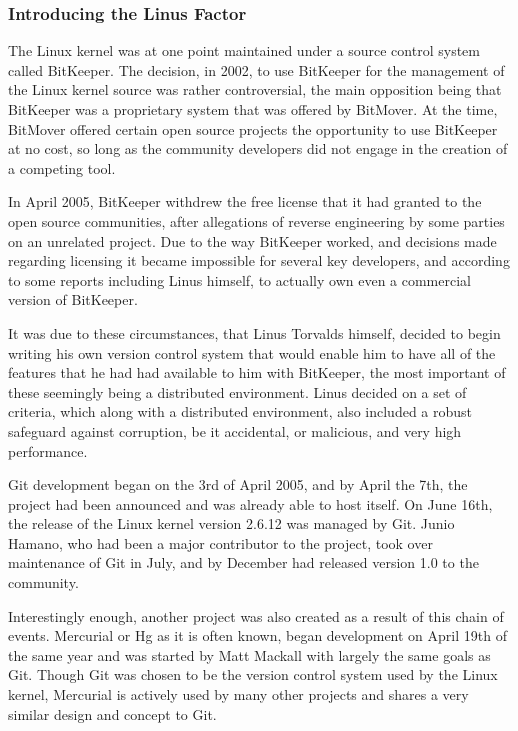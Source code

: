 \subsubsection{Introducing the Linus Factor}
The Linux kernel was at one point maintained under a source control system called BitKeeper.  The decision, in 2002, to use BitKeeper for the management of the Linux kernel source was rather controversial, the main opposition being that BitKeeper was a proprietary system that was offered by BitMover.  At the time, BitMover offered certain open source projects the opportunity to use BitKeeper at no cost, so long as the community developers did not engage in the creation of a competing tool.

In April 2005, BitKeeper withdrew the free license that it had granted to the open source communities, after allegations of reverse engineering by some parties on an unrelated project.  Due to the way BitKeeper worked, and decisions made regarding licensing it became impossible for several key developers, and according to some reports including Linus himself, to actually own even a commercial version of BitKeeper.

It was due to these circumstances, that Linus Torvalds himself, decided to begin writing his own version control system that would enable him to have all of the features that he had had available to him with BitKeeper, the most important of these seemingly being a distributed environment.  Linus decided on a set of criteria, which along with a distributed environment, also included a robust safeguard against corruption, be it accidental, or malicious, and very high performance.

Git development began on the 3rd of April 2005, and by April the 7th, the project had been announced and was already able to host itself.  On June 16th, the release of the Linux kernel version 2.6.12 was managed by Git.  Junio Hamano, who had been a major contributor to the project, took over maintenance of Git in July, and by December had released version 1.0 to the community.

Interestingly enough, another project was also created as a result of this chain of events.  Mercurial or Hg as it is often known, began development on April 19th of the same year and was started by Matt Mackall with largely the same goals as Git.  Though Git was chosen to be the version control system used by the Linux kernel, Mercurial is actively used by many other projects and shares a very similar design and concept to Git.

